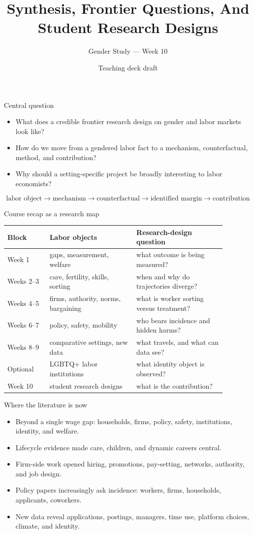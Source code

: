 \documentclass[aspectratio=169,11pt]{beamer}
\title{Synthesis, Frontier Questions, And Student Research Designs}
\subtitle{Gender Study --- Week 10}
\author{Teaching deck draft}
\date{}
\begin{document}
\begin{frame}
  \titlepage
\end{frame}

\begin{frame}{Central question}
\begin{itemize}
    \item What does a credible frontier research design on gender and labor markets look like?
    \item How do we move from a gendered labor fact to a mechanism, counterfactual, method, and contribution?
    \item Why should a setting-specific project be broadly interesting to labor economists?
\end{itemize}
\vspace{0.25cm}
\[
\text{labor object} \rightarrow \text{mechanism} \rightarrow
\text{counterfactual} \rightarrow \text{identified margin} \rightarrow
\text{contribution}
\]
\end{frame}

\begin{frame}{Course recap as a research map}
\scriptsize
\begin{tabular}{p{0.17\linewidth} p{0.35\linewidth} p{0.36\linewidth}}
\toprule
Block & Labor objects & Research-design question \\
\midrule
Week 1 & gaps, measurement, welfare & what outcome is being measured? \\
Weeks 2--3 & care, fertility, skills, sorting & when and why do trajectories diverge? \\
Weeks 4--5 & firms, authority, norms, bargaining & what is worker sorting versus treatment? \\
Weeks 6--7 & policy, safety, mobility & who bears incidence and hidden harms? \\
Weeks 8--9 & comparative settings, new data & what travels, and what can data see? \\
Optional & LGBTQ+ labor institutions & what identity object is observed? \\
Week 10 & student research designs & what is the contribution? \\
\bottomrule
\end{tabular}
\end{frame}

\begin{frame}{Where the literature is now}
\begin{itemize}
    \item Beyond a single wage gap: households, firms, policy, safety, institutions, identity, and welfare.
    \item Lifecycle evidence made care, children, and dynamic careers central.
    \item Firm-side work opened hiring, promotions, pay-setting, networks, authority, and job design.
    \item Policy papers increasingly ask incidence: workers, firms, households, applicants, coworkers.
    \item New data reveal applications, postings, managers, time use, platform choices, climate, and identity.
\end{itemize}
\end{frame}
\end{document}
